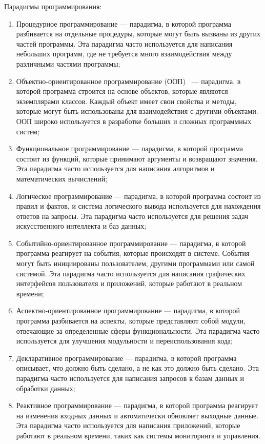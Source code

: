Парадигмы программирования:
\begin{enumerate}
    \item Процедурное программирование --- парадигма, в которой программа разбивается на отдельные процедуры, которые могут быть вызваны из других частей программы. Эта парадигма часто используется для написания небольших программ, где не требуется много взаимодействия между различными частями программы;
    \item Объектно-ориентированное программирование (ООП)~\cite{b10} --- парадигма, в которой программа строится на основе объектов, которые являются экземплярами классов. Каждый объект имеет свои свойства и методы, которые могут быть использованы для взаимодействия с другими объектами. ООП широко используется в разработке больших и сложных программных систем;
    \item Функциональное программирование --- парадигма, в которой программа состоит из функций, которые принимают аргументы и возвращают значения. Эта парадигма часто используется для написания алгоритмов и математических вычислений;
    \item Логическое программирование  --- парадигма, в которой программа состоит из правил и фактов, и система логического вывода используется для нахождения ответов на запросы. Эта парадигма часто используется для решения задач искусственного интеллекта и баз данных;
    \item Событийно-ориентированное программирование --- парадигма, в которой программа реагирует на события, которые происходят в системе. События могут быть инициированы пользователем, другими программами или самой системой. Эта парадигма часто используется для написания графических интерфейсов пользователя и приложений, которые работают в реальном времени;
    \item Аспектно-ориентированное программирование --- парадигма, в которой программа разбивается на аспекты, которые представляют собой модули, отвечающие за определенные сферы функциональности. Эта парадигма часто используется для улучшения модульности и переиспользования кода;
    \item Декларативное программирование --- парадигма, в которой программа описывает, что должно быть сделано, а не как это должно быть сделано. Эта парадигма часто используется для написания запросов к базам данных и обработки данных;
    \item Реактивное программирование --- парадигма, в которой программа реагирует на изменения входных данных и автоматически обновляет выходные данные. Эта парадигма часто используется для написания приложений, которые работают в реальном времени, таких как системы мониторинга и управления.
\end{enumerate}


